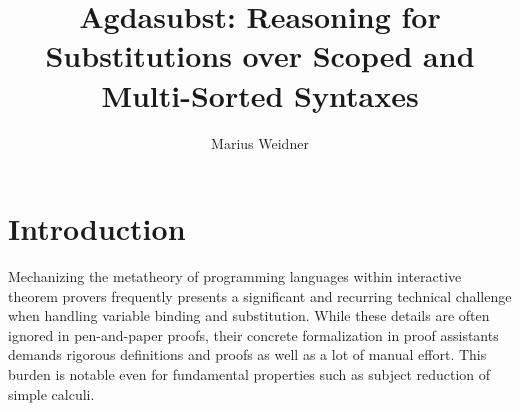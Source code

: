 \documentclass[screen,nonacm]{acmart}
\begin{document}
\title{Agdasubst: Reasoning for Substitutions over Scoped and Multi-Sorted Syntaxes}

\author{Marius Weidner}

\begin{abstract}

\end{abstract}

\maketitle

\section{Introduction}\label{sec:introduction}

Mechanizing the metatheory of programming languages within interactive theorem
provers frequently presents a significant and recurring technical challenge
when handling variable binding and substitution. While these details are often
ignored in pen-and-paper proofs, their concrete formalization in proof
assistants demands rigorous definitions and proofs as well as a lot of manual
effort. This burden is notable even for fundamental properties such as subject
reduction of simple calculi.
\end{document}
